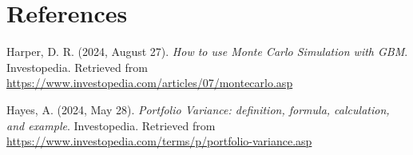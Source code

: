\documentclass[11pt]{article}
\begin{document}
\clearpage
\section*{References}
Harper, D. R. (2024, August 27). \textit{How to use Monte Carlo Simulation with GBM}. Investopedia. Retrieved from \url{https://www.investopedia.com/articles/07/montecarlo.asp}

Hayes, A. (2024, May 28). \textit{Portfolio Variance: definition, formula, calculation, and example}. Investopedia. Retrieved from \url{https://www.investopedia.com/terms/p/portfolio-variance.asp}
\end{document}
